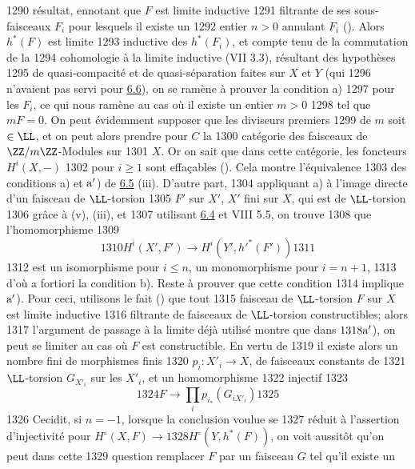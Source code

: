   1290	résultat, en\pageoriginale notant que $F$ est limite inductive
  1291	filtrante de ses sous-faisceaux $F_i$ pour lesquels il existe un
  1292	entier $n>0$ annulant $F_i$ (). Alors $h^{\ast}(F)$ est limite
  1293	inductive des $h^{\ast}(F_i)$, et compte tenu de la commutation de la
  1294	cohomologie à la limite inductive (VII 3.3), résultant des hypothèses
  1295	de quasi-compacité et de quasi-séparation faites sur $X$ et $Y$ (qui
  1296	n'avaient pas servi pour \hyperref[XII.cor6.6]{6.6}), on se ramène à prouver la condition a)
  1297	pour les $F_i$, ce qui nous ramène au cas où il existe un entier $m>0$
  1298	tel que $mF=0$. On peut évidemment supposer que les diviseurs premiers
  1299	de $m$ soit $\in \LL$, et on peut alors prendre pour $C$ la
  1300	catégorie des faisceaux de $\ZZ/m\ZZ$-Modules sur
  1301	$X$. Or on sait que dans cette catégorie, les foncteurs $H^{i}(X, -)$
  1302	pour $i\geq 1$ sont effaçables (\quad). Cela montre l'équivalence
  1303	des conditions a) et ${\rm a'}$) de \hyperref[XII.prop6.5]{6.5} (iii). D'autre part,
  1304	appliquant a) à l'image directe d'un faisceau de $\LL$-torsion
  1305	$F'$ sur $X'$, $X'$ fini sur $X$, qui est de $\LL$-torsion
  1306	grâce à  (v),  (iii), et 
  1307	utilisant \hyperref[XII.lem6.4]{6.4} et VIII 5.5, on trouve
  1308	que l'homomorphisme
  1309	$$
  1310	H^{i}(X',F')\longrightarrow H^{i}(Y',{h'}^{\ast}(F'))
  1311	$$
  1312	est un isomorphisme pour $i\leq n$, un monomorphisme pour $i=n+1$,
  1313	d'où a fortiori la condition b). Reste à prouver que cette condition
  1314	implique ${\rm a'}$). Pour ceci, utilisons le fait () que tout
  1315	faisceau de $\LL$-torsion $F$ sur $X$ est limite inductive
  1316	filtrante de faisceaux de $\LL$-torsion constructibles; alors
  1317	l'argument de passage à la limite déjà utilisé montre que dans ${\rm
  1318	a'}$), on peut se limiter au cas où $F$ est constructible. En vertu de
  1319	 il existe alors un nombre fini de morphismes finis
  1320	$p_i:X'_i\rightarrow X$, de faisceaux constants de
  1321	$\LL$-torsion $G_{X'_i}$ sur les $X'_i$, et un homomorphisme
  1322	injectif
  1323	$$
  1324	F\longrightarrow \prod_{i}p_{i_{\ast}}(G_{i X'_i})
  1325	$$
  1326	Ceci\pageoriginale dit, si $n=-1$, \ie lorsque la conclusion voulue se
  1327	réduit à l'assertion d'injectivité pour $H^{\circ}(X,F)\rightarrow
  1328	H^{\circ}(Y,h^{\ast}(F))$, on voit aussitôt qu'on peut dans cette
  1329	question remplacer $F$ par un faisceau $G$ tel qu'il existe un

